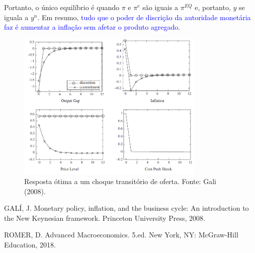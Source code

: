 \documentclass[12pt]{article}
\begin{document}
Portanto, o único equilíbrio é quando $\pi$ e $\pi^e$ são iguais a $\pi^{EQ}$ e, portanto, $y$ se iguala a $y^n$. Em resumo, \textcolor{blue}{tudo que o poder de  discrição da autoridade monetária faz é aumentar a inflação sem afetar o produto agregado}.

\begin{figure}[h!]
    \centering
    \includegraphics[width=0.8\textwidth]{./figures/aula13_fig2.PNG}
    \caption{Resposta ótima a um choque transitório de oferta. Fonte: Gali (2008).}
    \label{fig:my_label}
\end{figure}

\begin{thebibliography}{}
    GALÍ, J. Monetary policy, inflation, and the business cycle: An introduction to the New Keynesian framework. Princeton University Press, 2008.
    
    ROMER, D. Advanced Macroeconomics. 5.ed. New York, NY: McGraw-Hill Education, 2018.
    \end{thebibliography}
\end{document}
